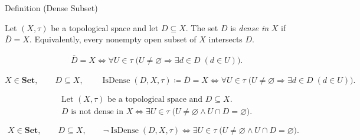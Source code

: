 
\begin{definitionbox}{Definition (Dense Subset)}
\begin{definition}
\label{def:dense-subset}
Let $(X,\tau)$ be a topological space and let $D\subseteq X$.  The set
$D$ is \emph{dense in} $X$ if $\overline{D}=X$.  Equivalently, every
nonempty open subset of $X$ intersects $D$.
\end{definition}
\end{definitionbox}

\begin{remark*}
\[
\begin{aligned}
&\overline{D}=X
\Longleftrightarrow
\forall U\in\tau\;
\bigl(U\neq\varnothing\Longrightarrow \exists d\in D\;(d\in U)\bigr).
\end{aligned}
\]
\end{remark*}

\begin{remark*}
\[
X\in\mathbf{Set},\qquad D\subseteq X,\qquad
\operatorname{IsDense}(D,X,\tau)\coloneqq
\overline{D}=X
\Longleftrightarrow
\forall U\in\tau\;
\bigl(U\neq\varnothing\Longrightarrow \exists d\in D\;(d\in U)\bigr).
\]
\end{remark*}

\begin{remark*}
\[
\begin{aligned}
&\text{Let }(X,\tau)\text{ be a topological space and }D\subseteq X.\\
&D\text{ is not dense in }X
\Longleftrightarrow
\exists U\in\tau\;\bigl(U\neq\varnothing\land U\cap D=\varnothing\bigr).
\end{aligned}
\]
\end{remark*}

\begin{remark*}
\[
X\in\mathbf{Set},\qquad D\subseteq X,\qquad
\neg\operatorname{IsDense}(D,X,\tau)\Longleftrightarrow
\exists U\in\tau\;\bigl(U\neq\varnothing\land U\cap D=\varnothing\bigr).
\]
\end{remark*}

